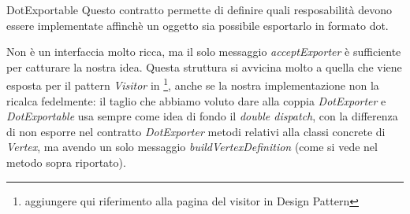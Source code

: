 \begin{paragraph}{DotExportable}
  Questo contratto permette di definire quali resposabilit\`a devono
  essere implementate affinch\`e un oggetto sia possibile esportarlo
  in formato dot. 

  Non \`e un interfaccia molto ricca, ma il solo messaggio
  \emph{acceptExporter} \`e sufficiente per catturare la nostra
  idea. Questa struttura si avvicina molto a quella che viene esposta
  per il pattern \emph{Visitor} in \footnote{aggiungere qui
    riferimento alla pagina del visitor in Design Pattern}, anche se
  la nostra implementazione non la ricalca fedelmente: il taglio che
  abbiamo voluto dare alla coppia \emph{DotExporter} e
  \emph{DotExportable} usa sempre come idea di fondo il \emph{double
    dispatch}, con la differenza di non esporre nel contratto
  \emph{DotExporter} metodi relativi alla classi concrete di
  \emph{Vertex}, ma avendo un solo messaggio
  \emph{buildVertexDefinition} (come si vede nel metodo sopra
  riportato).
\end{paragraph}




